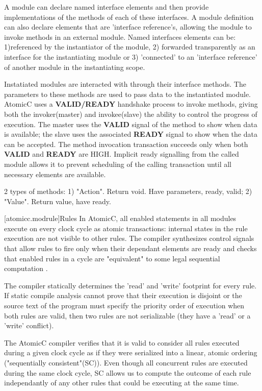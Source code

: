A module can declare named interface elements and then provide implementations of
the methods of each of these interfaces.  A module definition can also declare
elements that are 'interface reference's, allowing the module to invoke methods
in an external module.
Named interfaces elements can be: 1)referenced by the instantiator of the module,
2) forwarded transparently as an interface for the instantiating module or 3) 'connected'
to an 'interface reference' of another module in the instantiating scope.

Instatiated modules are interacted with through their interface methods.  The parameters
to these methods are used to pass data to the instantiated module.
AtomicC uses a \textbf{VALID/READY} handshake process\cite{Fletcher2009, AXISpec} to invoke methods,
giving both the invoker(master) and invokee(slave) the ability to control the progress of execution.
The master uses the \textbf{VALID} signal
of the method to show when data is available; the slave uses the associated
\textbf{READY} signal to show when the data can be accepted.
The method invocation transaction succeeds only when
both \textbf{VALID} and \textbf{READY} are HIGH.
Implicit ready signalling from the called module allows it to prevent
scheduling of the calling transaction until all necessary elements are
available.

2 types of methods: 1) "Action".  Return void. Have parameters, ready, valid; 2) "Value". Return value, have ready.

[atomicc.modrule]{Rules}
In AtomicC, all enabled statements in all modules execute on every clock cycle
as atomic transactions: internal states in the rule
execution are not visible to other rules.
The compiler synthesizes control signals that allow rules to fire
only when their dependant elements are ready and checks that enabled
rules in a cycle are
"equivalent" to some legal sequential computation \cite{Lamport:1979:MMC:1311099.1311750}.

The compiler statically determines the 'read' and 'write'
footprint for every rule.
If static compile analysis cannot prove that their execution is disjoint
or the source text of the program must specify the priority order of execution
when both rules are valid,
then two rules are not serializable (they have a 'read' or a 'write' conflict).

The AtomicC compiler verifies that it is valid to consider
all rules executed during a given clock cycle
as if they were serialized into a linear, atomic ordering ("sequentially consistent"(SC)).
Even though all concurrent rules are executed during the same clock cycle, SC allows us to compute the
outcome of each rule independantly of any other rules that could be executing at the same time.

